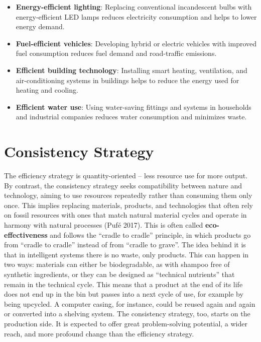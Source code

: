 \documentclass[
  british,
  a4paper,
  DIV=11,
  numbers=noendperiod,
  oneside,
  openany]{scrreprt}
\providecommand{\tightlist}{%
  \setlength{\itemsep}{0pt}\setlength{\parskip}{0pt}}
\begin{document}
\begin{tcolorbox}[enhanced jigsaw, arc=.35mm, bottomrule=.15mm, bottomtitle=1mm, breakable, colback=white, colbacktitle=quarto-callout-tip-color!10!white, colframe=quarto-callout-tip-color-frame, coltitle=black, left=2mm, leftrule=.75mm, opacityback=0, opacitybacktitle=0.6, rightrule=.15mm, title={Examples of the efficiency strategy}, titlerule=0mm, toprule=.15mm, toptitle=1mm]

\begin{itemize}
\tightlist
\item
  \textbf{Energy-efficient lighting}: Replacing conventional
  incandescent bulbs with energy-efficient LED lamps reduces electricity
  consumption and helps to lower energy demand.
\item
  \textbf{Fuel-efficient vehicles}: Developing hybrid or electric
  vehicles with improved fuel consumption reduces fuel demand and
  road-traffic emissions.
\item
  \textbf{Efficient building technology}: Installing smart heating,
  ventilation, and air-conditioning systems in buildings helps to reduce
  the energy used for heating and cooling.
\item
  \textbf{Efficient water use}: Using water-saving fittings and systems
  in households and industrial companies reduces water consumption and
  minimizes waste.
\end{itemize}

\end{tcolorbox}

\section{Consistency Strategy}\label{consistency-strategy}

The efficiency strategy is quantity-oriented -- less resource use for
more output. By contrast, the consistency strategy seeks compatibility
between nature and technology, aiming to use resources repeatedly rather
than consuming them only once. This implies replacing materials,
products, and technologies that often rely on fossil resources with ones
that match natural material cycles and operate in harmony with natural
processes (Pufé 2017). This is often called \textbf{eco-effectiveness}
and follows the ``cradle to cradle'' principle, in which products go
from ``cradle to cradle'' instead of from ``cradle to grave''. The idea
behind it is that in intelligent systems there is no waste, only
products. This can happen in two ways: materials can either be
biodegradable, as with shampoo free of synthetic ingredients, or they
can be designed as ``technical nutrients'' that remain in the technical
cycle. This means that a product at the end of its life does not end up
in the bin but passes into a next cycle of use, for example by being
upcycled. A computer casing, for instance, could be reused again and
again or converted into a shelving system. The consistency strategy,
too, starts on the production side. It is expected to offer great
problem-solving potential, a wider reach, and more profound change than
the efficiency strategy.
\end{document}

